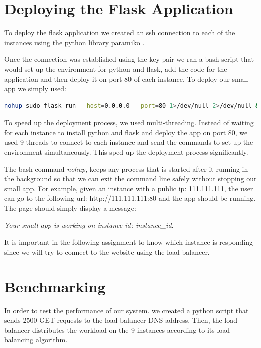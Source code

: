 \documentclass[12pt]{article}
\begin{document}
\section{Deploying the Flask Application}

To deploy the flask application we created an ssh connection to each of the instances using the python library paramiko \cite{paramiko}.\vspace{1em}

Once the connection was established using the key pair we ran a bash script that would set up the environment for python and flask, add the code for the application and then deploy it on port 80 of each instance.\vspace{1em}
To deploy our small app we simply used:
\begin{lstlisting}[language=Bash]
nohup sudo flask run --host=0.0.0.0 --port=80 1>/dev/null 2>/dev/null &
\end{lstlisting}\vspace{1em}

To speed up the deployment process, we used multi-threading. Instead of waiting for each instance to install python and flask and deploy the app on port 80, we used 9 threads to connect to each instance and send the commands to set up the environment simultaneously. This sped up the deployment process significantly.\vspace{1em}

The bash command \emph{nohup}, keeps any process that is started after it running in the background so that we can exit the command line safely without stopping our small app. For example, given an instance with a public ip: 111.111.111, the user can go to the following url: http://111.111.111:80 and the app should be running. The page should simply display a message:\vspace{1em}

\emph{Your small app is working on instance id: instance\_id}.\vspace{1em}

It is important in the following assignment to know which instance is responding since we will try to connect to the website using the load balancer. 

\section{Benchmarking}

In order to test the performance of our system. we created a python script that sends 2500 GET requests to the load balancer DNS address. Then, the load balancer distributes the workload on the 9 instances according to its load balancing algorithm.\vspace{1em}
\end{document}
